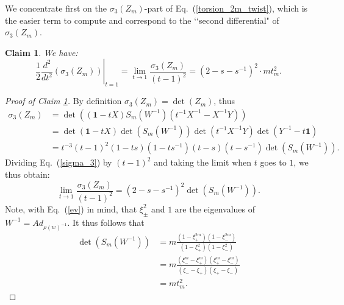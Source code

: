 \documentclass[a4paper]{amsart}
\theoremstyle{plain}
\newtheorem{claim}[theorem]{Claim}
\theoremstyle{definition}
\theoremstyle{remark}
\newcommand{\I}{\mathbf{1}}
\begin{document}
We concentrate first on  the $\sigma_3(Z_m)$-part of Eq.~(\ref{torsion_2m_twist}), which is the easier term to compute and correspond to the \lq\lq second differential" of $\sigma_3(Z_m)$.
\begin{claim}\label{claim:second_diff_sigma_3}
We have: 
\[
\frac{1}{2} \left.\frac{d^2}{dt^2} (\sigma_3(Z_m))\right|_{t=1} = \lim_{t \to 1}\frac{\sigma_3(Z_m)}{(t-1)^2}
=(2-s-s^{-1})^2 \cdot m t_m^2.
\]
\end{claim}
\begin{proof}[Proof of Claim \ref{claim:second_diff_sigma_3}]
By definition $\sigma_3(Z_m)=\det(Z_m)$, thus
\begin{align}
\sigma_3(Z_m)
    &=
    \det(
        (\I-tX)S_m(W^{-1})(t^{-1}X^{-1} - X^{-1}Y)
            ) \nonumber \\
    &=
    \det(\I-tX)
    \det(S_m(W^{-1}))
    \det(t^{-1}X^{-1}Y)
    \det(Y^{-1}-t\I) \nonumber \\
    &=
    t^{-3}(t-1)^2(1-ts)(1-ts^{-1})(t-s)(t-s^{-1})
    \det(S_m(W^{-1})). \label{sigma_3}
\end{align}
{Dividing Eq.~(\ref{sigma_3}) by $(t-1)^2$ and taking the limit} when $t$ goes to $1$, we thus obtain: 
\begin{equation*}\label{sigma_31}
\lim_{t \to 1}
\frac{\sigma_3(Z_m)}{(t-1)^2}
=
(2-s-s^{-1})^2\det(S_m(W^{-1})).
\end{equation*}
Note, with Eq.~(\ref{ev}) in mind, that $\xi_{\pm}^2$ and $1$ are the eigenvalues of $W^{-1} = Ad_{\rho(w)^{-1}}$. It thus follows that 
\begin{align*}
\det(S_m(W^{-1}))
&=
m
\frac{(1-\xi_{+}^{2m})(1-\xi_{-}^{2m})}{(1-\xi_{+}^2)(1-\xi_{-}^2)} \\
&=
m
\frac{(\xi_{-}^m - \xi_{+}^m)(\xi_{+}^m - \xi_{-}^m)}{(\xi_{-} - \xi_{+})(\xi_{+} - \xi_{-})} \\
&=
mt_m^2. 
\end{align*}
\end{proof}
\end{document}
